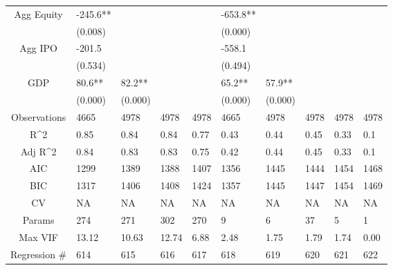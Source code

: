 \documentclass{article}
\begin{document}
\begin{table}[H]
\begin{tabular}{|clllllllll|}
  Agg Equity & -245.6** &  &  &  & -653.8** &  &  &  &  \\ 
   & (0.008) &  &  &  & (0.000) &  &  &  &  \\ 
  Agg IPO & -201.5 &  &  &  & -558.1 &  &  &  &  \\ 
   & (0.534) &  &  &  & (0.494) &  &  &  &  \\ 
  GDP & 80.6** & 82.2** &  &  & 65.2** & 57.9** &  &  &  \\ 
   & (0.000) & (0.000) &  &  & (0.000) & (0.000) &  &  &  \\ 
  \hline 
 Observations & 4665 & 4978 & 4978 & 4978 & 4665 & 4978 & 4978 & 4978 & 4978 \\ 
  R^2 & 0.85 & 0.84 & 0.84 & 0.77 & 0.43 & 0.44 & 0.45 & 0.33 & 0.1 \\ 
  Adj R^2 & 0.84 & 0.83 & 0.83 & 0.75 & 0.42 & 0.44 & 0.45 & 0.33 & 0.1 \\ 
  AIC & 1299 & 1389 & 1388 & 1407 & 1356 & 1445 & 1444 & 1454 & 1468 \\ 
  BIC & 1317 & 1406 & 1408 & 1424 & 1357 & 1445 & 1447 & 1454 & 1469 \\ 
  CV & NA & NA & NA & NA & NA & NA & NA & NA & NA \\ 
  Params & 274 & 271 & 302 & 270 & 9 & 6 & 37 & 5 & 1 \\ 
  Max VIF & 13.12 & 10.63 & 12.74 & 6.88 & 2.48 & 1.75 & 1.79 & 1.74 & 0.00 \\ 
  Regression \# & 614 & 615 & 616 & 617 & 618 & 619 & 620 & 621 & 622 \\ 
   \hline
\end{tabular}
 
\end{table}
\end{document}
